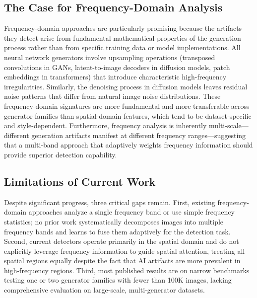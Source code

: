 \documentclass[journal]{IEEEtran}
\begin{document}
\subsection{The Case for Frequency-Domain Analysis}
Frequency-domain approaches are particularly promising because the artifacts they detect arise from fundamental mathematical properties of the generation process rather than from specific training data or model implementations. All neural network generators involve upsampling operations (transposed convolutions in GANs, latent-to-image decoders in diffusion models, patch embeddings in transformers) that introduce characteristic high-frequency irregularities. Similarly, the denoising process in diffusion models leaves residual noise patterns that differ from natural image noise distributions. These frequency-domain signatures are more fundamental and more transferable across generator families than spatial-domain features, which tend to be dataset-specific and style-dependent. Furthermore, frequency analysis is inherently multi-scale---different generation artifacts manifest at different frequency ranges---suggesting that a multi-band approach that adaptively weights frequency information should provide superior detection capability.

\subsection{Limitations of Current Work}
Despite significant progress, three critical gaps remain. First, existing frequency-domain approaches analyze a single frequency band or use simple frequency statistics; no prior work systematically decomposes images into multiple frequency bands and learns to fuse them adaptively for the detection task. Second, current detectors operate primarily in the spatial domain and do not explicitly leverage frequency information to guide spatial attention, treating all spatial regions equally despite the fact that AI artifacts are more prevalent in high-frequency regions. Third, most published results are on narrow benchmarks testing one or two generator families with fewer than 100K images, lacking comprehensive evaluation on large-scale, multi-generator datasets.
\end{document}
